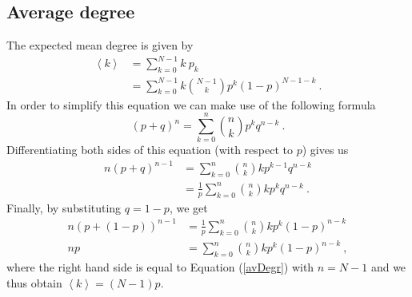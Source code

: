 \documentclass[11 pt , letterpaper , twoside , openright]{book}
\begin{document}
\subsection{Average degree}\label{degree}
The expected mean degree is given by \cite{Hopcroft2006}
\begin{equation}\label{avDegr}
\begin{split}
	\left<k\right> &= \sum_{k=0}^{N-1} k\  p_k  \\
&= \sum_{k=0}^{N-1} k \binom{N-1}{k}p^k (1-p)^{N-1-k} \ .
\end{split}
\end{equation}
In order to simplify this equation we can make use of the following formula \cite{Hopcroft2006}
\begin{equation} 
	(p+q)^n = \sum_{k=0}^n \binom{n}{k} p^k q^{n-k} \ .
\end{equation}
Differentiating both sides of this equation (with respect to $p$) gives us \cite{Hopcroft2006}
\begin{equation}
\begin{split}
	n(p+q)^{n-1} &= \sum_{k=0}^n \binom{n}{k} k p^{k-1} q^{n-k} \\
	&= \frac{1}{p} \sum_{k=0}^n \binom{n}{k} k p^{k} q^{n-k} \ .
\end{split}
\end{equation}
Finally, by substituting $q = 1-p$, we get \cite{Hopcroft2006}
\begin{equation}
\begin{split}
	n (p+(1-p))^{n-1} &= \frac{1}{p} \sum_{k=0}^n \binom{n}{k} k p^{k} (1-p)^{n-k} \\
	np &= \sum_{k=0}^n \binom{n}{k} k p^{k} (1-p)^{n-k} \ ,
\end{split}
\end{equation}
where the right hand side is equal to Equation (\ref{avDegr}) with $n = N-1$ and we thus obtain $\left<k\right> = (N-1)p$.
\end{document}
